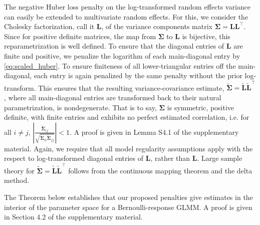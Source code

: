 \documentclass[11pt, a4paper]{article}
\newcommand*{\bb}{\boldsymbol}
\theoremstyle{example} \newtheorem{example}{Example}[section]
\theoremstyle{theorem} \newtheorem{theorem}{Theorem}[section]
\def\bSigma{\bb{\Sigma}}
\def\bL{\bb{L}}
\def\bLt{\tilde{\bb{L}}}
\begin{document}
The negative Huber loss penalty on the log-transformed random effects variance can easily be extended to multivariate random effects. For this, we consider the Cholesky factorization, call it $\bL$, of the variance components matrix $\bSigma = \bL\bL^\top$. Since for positive definite matrices, the map from $\bSigma$ to $\bL$ is bijective, this reparametrization is well defined. To ensure that the diagonal entries of $\bL$ are finite and positive, we penalize the logarithm of each main-diagonal entry by \eqref{eq:scaled_huber}. To ensure finiteness of all lower-triangular entries off the main-diagonal, each entry is again penalized by the same penalty without the prior log-transform. This ensures that the resulting variance-covariance estimate, $\widetilde{\bSigma} = \bLt\bLt^\top$, where all main-diagonal entries are transformed back to their natural parametrization, is nondegenerate. That is to say, $\bSigma$ is symmetric, positive definite, with finite entries and exhibits no perfect estimated correlation, i.e. for all $i \neq j$, $\left|\frac{\widetilde{\bSigma}_{ij} }{\sqrt{ \widetilde{\bSigma}_{ii} \widetilde{\bSigma}_{jj}}}\right|<1$. A proof is given in Lemma S4.1 of the supplementary material. Again, we require that all model regularity assumptions apply with the respect to log-transformed diagonal entries of $\bL$, rather than $\bL$. Large sample theory for $\widetilde{\bSigma}=\bLt\bLt^\top$ follows from the continuous mapping theorem and the delta method. 

The Theorem below establishes that our proposed penalties give estimates in the interior of the parameter space for a Bernoulli-response GLMM. A proof is given in Section 4.2 of the supplementary material. 
\end{document}
